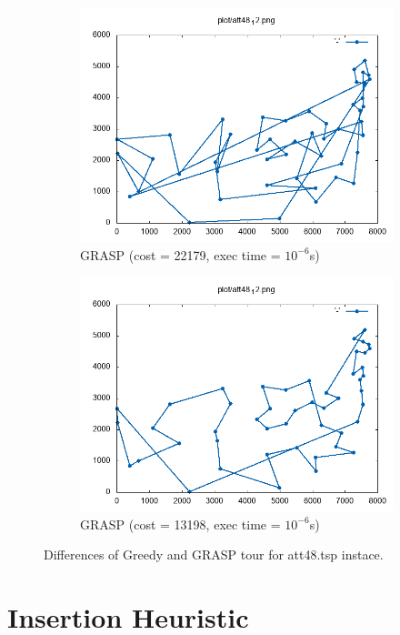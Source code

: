 \begin{figure}[h]
\begin{subfigure}{.5\textwidth}
	\includegraphics[width=\columnwidth]{../res/att48_12_3.png}
	\caption{GRASP (cost = 22179, exec time = $ 10^{-6} $s)}
	\label{fig:att48_GRASP3}
	\end{subfigure}
	\begin{subfigure}{.5\textwidth}
	\centering
	\includegraphics[width=\columnwidth]{../res/att48_12_4.png}
	\caption{GRASP (cost = 13198, exec time = $ 10^{-6} $s)}
	\label{fig:att48_GRASP4}
	\end{subfigure}
	\caption{Differences of Greedy and GRASP tour for att48.tsp instace.}
	\label{fig:att48_diff}
\end{figure}

\section{Insertion Heuristic}
